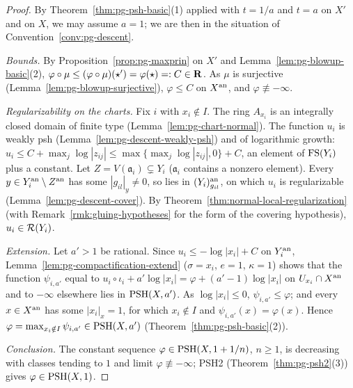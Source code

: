 \begin{proof}
By Theorem~\ref{thm:pg-psh-basic}(1) applied with $t=1/a$ and $t=a$ on $X'$ and on $X$, we may assume $a=1$; we are then in the situation of
Convention~\ref{conv:pg-descent}.

\emph{Bounds.} By Proposition~\ref{prop:pg-maxprin} on $X'$ and Lemma~\ref{lem:pg-blowup-basic}(2), $\varphi\circ\mu\le(\varphi\circ\mu)(\star')=\varphi(\star)
=:C\in\mathbf{R}$. As $\mu$ is surjective (Lemma~\ref{lem:pg-blowup-surjective}), $\varphi\le C$ on $X^{\mathrm{an}}$, and $\varphi\not\equiv-\infty$.

\emph{Regularizability on the charts.} Fix $i$ with $x_i\notin I$. The ring $A_{x_i}$ is an integrally closed domain of finite type
(Lemma~\ref{lem:pg-chart-normal}). The function $u_i$ is weakly psh (Lemma~\ref{lem:pg-descent-weakly-psh}) and of logarithmic growth:
$u_i\le C+\max_j\log|z_{ij}|\le\max\{\max_j\log|z_{ij}|,0\}+C$, an element of $\mathrm{FS}(Y_i)$ plus a constant. Let $Z=V(\mathfrak a_i)\subsetneq Y_i$ ($\mathfrak a_i$
contains a nonzero element). Every $y\in Y_i^{\mathrm{an}}\setminus Z^{\mathrm{an}}$ has some $|g_{il}|_y\ne0$, so lies in $(Y_i)_{g_{il}}^{\mathrm{an}}$, on which $u_i$ is regularizable
(Lemma~\ref{lem:pg-descent-cover}). By Theorem~\ref{thm:normal-local-regularization} (with Remark~\ref{rmk:gluing-hypotheses} for the form of the
covering hypothesis), $u_i\in\mathcal{R}(Y_i)$.

\emph{Extension.} Let $a'>1$ be rational. Since $u_i\le-\log|x_i|+C$ on $Y_i^{\mathrm{an}}$, Lemma~\ref{lem:pg-compactification-extend} ($\sigma=x_i$, $e=1$,
$\kappa=1$) shows that the function $\psi_{i,a'}$ equal to $u_i\circ\iota_i+a'\log|x_i|=\varphi+(a'-1)\log|x_i|$ on $U_{x_i}\cap X^{\mathrm{an}}$ and to $-\infty$
elsewhere lies in $\operatorname{PSH}(X,a')$. As $\log|x_i|\le0$, $\psi_{i,a'}\le\varphi$; and every $x\in X^{\mathrm{an}}$ has some $|x_i|_x=1$, for which $x_i\notin I$ and
$\psi_{i,a'}(x)=\varphi(x)$. Hence $\varphi=\max_{x_i\notin I}\psi_{i,a'}\in\operatorname{PSH}(X,a')$ (Theorem~\ref{thm:pg-psh-basic}(2)).

\emph{Conclusion.} The constant sequence $\varphi\in\operatorname{PSH}(X,1+1/n)$, $n\ge1$, is decreasing with classes tending to $1$ and limit
$\varphi\not\equiv-\infty$; PSH2 (Theorem~\ref{thm:pg-psh2}(3)) gives $\varphi\in\operatorname{PSH}(X,1)$.
\end{proof}

